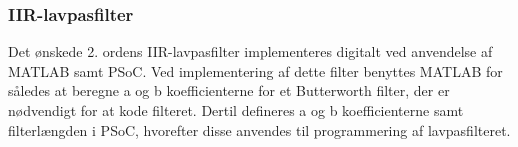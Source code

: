\subsubsection{IIR-lavpasfilter}
Det ønskede 2. ordens IIR-lavpasfilter implementeres digitalt ved anvendelse af MATLAB samt PSoC.
Ved implementering af dette filter benyttes MATLAB for således at beregne a og b koefficienterne for et Butterworth filter, der er nødvendigt for at kode filteret. Dertil defineres a og b koefficienterne samt filterlængden i PSoC, hvorefter disse anvendes til programmering af lavpasfilteret. 